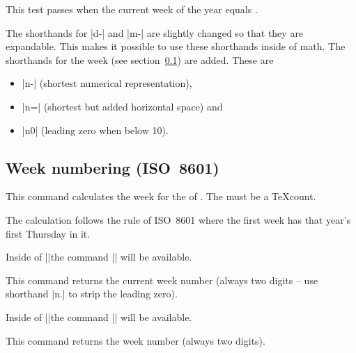 \begin{multicols}{2}
\begin{itemize}
    This test passes when the current week of the year equals .
\end{itemize}
The shorthands for |d-| and |m-| are slightly changed so that they are
expandable. This makes it possible to use these shorthands inside of \pgfname math.
The shorthands for the week (see section~\ref{calendar:weeknumbering})
are added. These are
\begin{itemize}
\item |n-| (shortest numerical representation),
\item |n=| (shortest but added horizontal space) and
\item |n0| (leading zero when below 10).
\end{itemize}

\subsection{Week numbering (ISO~8601)}
\label{calendar:weeknumbering}
\begin{command}{\pgfextcalendarjulianyeartoweek{}}
\cmdcompat{\pgfcalendarjulianyeartoweek}
  This command calculates the week for the  of .
  The  must be a \TeX\space count.

  The calculation follows the rule of ISO~8601 where the first week has that
  year's first Thursday in it.
\end{command}

Inside of |\pgfcalendar|\indexCommandO\pgfcalendar the command |\pgfextcalendarcurrentweek| will be available.
\begin{command}{\pgfextcalendarcurrentweek}
\cmdcompat{\pgfcalendarcurrentweek}
  This command returns the current week number (always two digits -- use shorthand |n.|
  to strip the leading zero).
\end{command}

Inside of |\ifdate|\indexCommandO\ifdate the command |\pgfextcalendarifdateweek| will be available.
\begin{command}{\pgfextcalendarifdateweek}
\cmdcompat{\pgfcalendarifdateweek}
  This command returns the week number (always two digits).
\end{command}
\end{multicols}